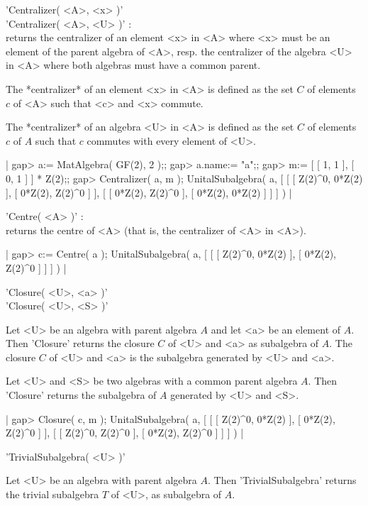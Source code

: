 'Centralizer( <A>, <x> )' \\
'Centralizer( <A>, <U> )' : \\
    returns the centralizer of an element <x> in <A> where <x>
    must be an element of the parent algebra of <A>, resp. the
    centralizer of the algebra <U> in <A> where both algebras must have
    a common parent.

The *centralizer* of an element <x> in <A>  is defined as the set  $C$ of
elements $c$ of <A> such that <c> and <x> commute.

The *centralizer* of an algebra <U> in <A>  is  defined as  the set $C$  of
elements $c$ of $A$ such that $c$ commutes with every element of <U>.

|    gap> a:= MatAlgebra( GF(2), 2 );;
    gap> a.name:= "a";;
    gap> m:= [ [ 1, 1 ], [ 0, 1 ] ] * Z(2);;
    gap> Centralizer( a, m );
    UnitalSubalgebra( a, [ [ [ Z(2)^0, 0*Z(2) ], [ 0*Z(2), Z(2)^0 ] ], 
      [ [ 0*Z(2), Z(2)^0 ], [ 0*Z(2), 0*Z(2) ] ] ] ) |

\vspace{5mm}

'Centre( <A> )' : \\
    returns the centre of <A> (that is, the centralizer of <A> in <A>).

|    gap> c:= Centre( a );
    UnitalSubalgebra( a, [ [ [ Z(2)^0, 0*Z(2) ], [ 0*Z(2), Z(2)^0 ] ] ] ) |

\vspace{5mm}

'Closure( <U>, <a> )' \\
'Closure( <U>, <S> )'

Let <U> be an algebra with  parent algebra $A$  and let <a> be an element
of $A$.  Then 'Closure' returns the closure $C$ of <U> and <a> as
subalgebra of $A$. The closure $C$ of <U> and <a> is the subalgebra
generated by <U> and <a>.

Let <U> and <S> be two algebras with a common parent algebra $A$. Then
'Closure' returns the subalgebra of $A$ generated by <U> and <S>.

|    gap> Closure( c, m );
    UnitalSubalgebra( a, [ [ [ Z(2)^0, 0*Z(2) ], [ 0*Z(2), Z(2)^0 ] ], 
      [ [ Z(2)^0, Z(2)^0 ], [ 0*Z(2), Z(2)^0 ] ] ] ) |


'TrivialSubalgebra( <U> )'

Let <U> be an algebra with parent algebra $A$. Then 'TrivialSubalgebra'
returns the trivial subalgebra $T$ of <U>, as subalgebra of $A$.

